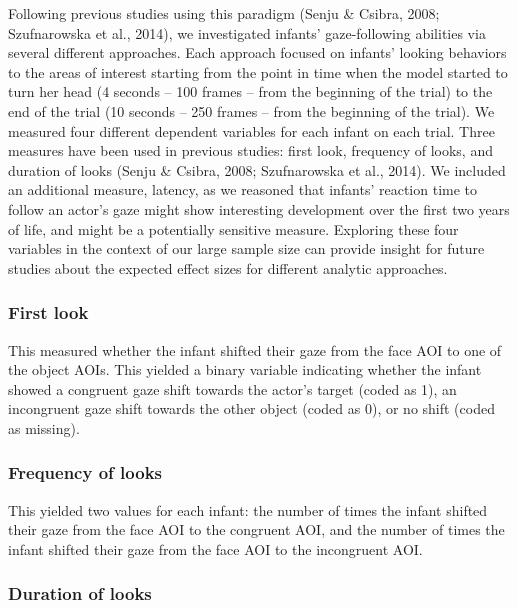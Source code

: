 \documentclass[english,,man,floatsintext]{apa6}
\begin{document}
Following previous studies using this paradigm (Senju \& Csibra, 2008; Szufnarowska et al., 2014), we investigated infants' gaze-following abilities via several different approaches. Each approach focused on infants' looking behaviors to the areas of interest starting from the point in time when the model started to turn her head (4 seconds -- 100 frames -- from the beginning of the trial) to the end of the trial (10 seconds -- 250 frames -- from the beginning of the trial). We measured four different dependent variables for each infant on each trial. Three measures have been used in previous studies: first look, frequency of looks, and duration of looks (Senju \& Csibra, 2008; Szufnarowska et al., 2014). We included an additional measure, latency, as we reasoned that infants' reaction time to follow an actor's gaze might show interesting development over the first two years of life, and might be a potentially sensitive measure. Exploring these four variables in the context of our large sample size can provide insight for future studies about the expected effect sizes for different analytic approaches.

\hypertarget{first-look}{%
\subsubsection{First look}\label{first-look}}

This measured whether the infant shifted their gaze from the face AOI to one of the object AOIs. This yielded a binary variable indicating whether the infant showed a congruent gaze shift towards the actor's target (coded as 1), an incongruent gaze shift towards the other object (coded as 0), or no shift (coded as missing).

\hypertarget{frequency-of-looks}{%
\subsubsection{Frequency of looks}\label{frequency-of-looks}}

This yielded two values for each infant: the number of times the infant shifted their gaze from the face AOI to the congruent AOI, and the number of times the infant shifted their gaze from the face AOI to the incongruent AOI.

\hypertarget{duration-of-looks}{%
\subsubsection{Duration of looks}\label{duration-of-looks}}
\end{document}
